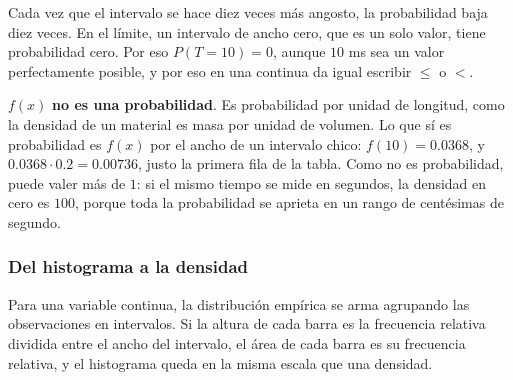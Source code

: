 \documentclass[11pt,letterpaper]{article}
\begin{document}
Cada vez que el intervalo se hace diez veces más angosto, la
probabilidad baja diez veces. En el límite, un intervalo de ancho cero,
que es un solo valor, tiene probabilidad cero. Por eso $P(T = 10) = 0$,
aunque $10$ ms sea un valor perfectamente posible, y por eso en una
continua da igual escribir $\le$ o $<$.

\begin{ojo}
    $f(x)$ \textbf{no es una probabilidad}. Es probabilidad por unidad
    de longitud, como la densidad de un material es masa por unidad de
    volumen. Lo que sí es probabilidad es $f(x)$ por el ancho de un
    intervalo chico: $f(10) = 0.0368$, y $0.0368 \cdot 0.2 = 0.00736$,
    justo la primera fila de la tabla. Como no es probabilidad, puede
    valer más de $1$: si el mismo tiempo se mide en segundos, la
    densidad en cero es $100$, porque toda la probabilidad se aprieta
    en un rango de centésimas de segundo.
\end{ojo}

\subsubsection*{Del histograma a la densidad}

Para una variable continua, la distribución empírica se arma agrupando
las observaciones en intervalos. Si la altura de cada barra es la
frecuencia relativa dividida entre el ancho del intervalo, el área de
cada barra es su frecuencia relativa, y el histograma queda en la misma
escala que una densidad.
\end{document}
